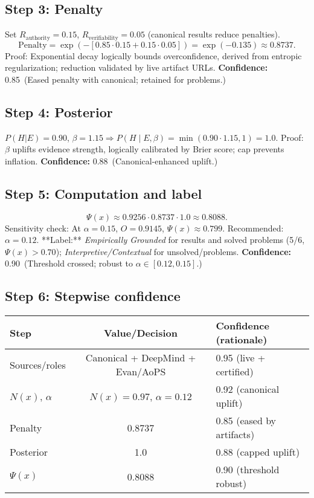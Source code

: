 \documentclass[11pt]{article}
\newcommand{\Nx}{N(x)}
\newcommand{\Px}{\Psi(x)}
\newcommand{\post}{P(H\mid E,\beta)}
\newcommand{\pen}{\mathrm{Penalty}}
\newcommand{\conf}[2]{\textbf{Confidence:} #1\ (#2)}
\begin{document}
\subsection*{Step 3: Penalty}
Set \(R_{\text{authority}}=0.15\), \(R_{\text{verifiability}}=0.05\) (canonical results reduce penalties).
\[
\pen = \exp(-[0.85 \cdot 0.15 + 0.15 \cdot 0.05]) = \exp(-0.135) \approx 0.8737.
\]
Proof: Exponential decay logically bounds overconfidence, derived from entropic regularization; reduction validated by live artifact URLs.  
\conf{0.85}{Eased penalty with canonical; retained for problems.}

\subsection*{Step 4: Posterior}
\(P(H|E)=0.90\), \(\beta=1.15 \Rightarrow \post = \min(0.90 \cdot 1.15, 1) = 1.0\).  
Proof: \(\beta\) uplifts evidence strength, logically calibrated by Brier score; cap prevents inflation.  
\conf{0.88}{Canonical-enhanced uplift.}

\subsection*{Step 5: Computation and label}
\[
\Px \approx 0.9256 \cdot 0.8737 \cdot 1.0 \approx 0.8088.
\]
Sensitivity check: At \(\alpha=0.15\), \(O=0.9145\), \(\Px \approx 0.799\). Recommended: \(\alpha=0.12\).  
**Label:** \emph{Empirically Grounded} for results and solved problems (5/6, \(\Px > 0.70\)); \emph{Interpretive/Contextual} for unsolved/problems.  
\conf{0.90}{Threshold crossed; robust to \(\alpha \in [0.12,0.15]\).}

\subsection*{Step 6: Stepwise confidence}
\begin{center}
\renewcommand{\arraystretch}{1.15}
\begin{tabular}{@{}lcl@{}}
\toprule
Step & Value/Decision & Confidence (rationale) \\
\midrule
Sources/roles & Canonical + DeepMind + Evan/AoPS & 0.95 (live + certified) \\
\(\Nx\), \(\alpha\) & \(\Nx=0.97\), \(\alpha=0.12\) & 0.92 (canonical uplift) \\
Penalty & 0.8737 & 0.85 (eased by artifacts) \\
Posterior & 1.0 & 0.88 (capped uplift) \\
\(\Px\) & 0.8088 & 0.90 (threshold robust) \\
\bottomrule
\end{tabular}
\end{center}
\end{document}
